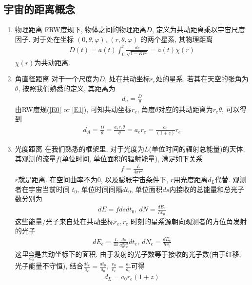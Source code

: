 \subsection{宇宙的距离概念}
\begin{enumerate}
    \item 物理距离 
    \subitem FRW度规下, 物体之间的物理距离$D$, 定义为共动距离乘以宇宙尺度因子. 对于处在坐标 $(0, \theta, \varphi)$, $(r, \theta, \varphi)$ 的两个星系, 其物理距离
    \begin{align*}
        D(t)=a(t)\int_0^r \frac{dr}{\sqrt{1-K r^2}}=a(t)\chi(r)
    \end{align*}
    $\chi(r)$为共动距离. 
    \item 角直径距离 
    \subitem 对于一个尺度为$D$, 处在共动坐标$r_e$处的星系, 若其在天空的张角为$\theta$, 按照我们熟悉的定义, 其距离为
    \begin{align*}
        d_a=\frac{D}{\theta}
    \end{align*}
    由RW度规(\ref{E0} or \ref{E1}), 可知共动坐标$r_e$, 角度$\theta$对应的共动距离为$r_e \theta$, 可以得到
    \begin{align*}
        d_A=\frac{D}{\theta}=\frac{a_e r_e \theta}{\theta}=a_e r_e =\frac{a_0}{(1+z)}r_e
    \end{align*}
    \item 光度距离 
    \subitem 在我们熟悉的框架里, 对于光度为$L$(单位时间的辐射总能量)的天体, 其观测的流量$f$(单位时间, 单位面积的辐射能量), 满足如下关系
    \begin{align*}
        f=\frac{L}{4 \pi r^2}
    \end{align*}
    $r$就是距离. 
    \subitem 在空间曲率不为0, 以及膨胀宇宙条件下,  $r$用光度距离$d_L$代替. 观测者在宇宙当前时间 $t_0$, 单位时间间隔$dt_0$, 单位面积$ds$内接收的总能量和总光子数分别为
    \begin{align*}
        dE=fdsdt_0,\ dN=\frac{d E_e}{hv_0}
    \end{align*}
    这些能量/光子来自处在共动坐标$r_e, r_e$ 时刻的星系源朝向观测者的方位角发射的光子
    \begin{align*}
        dE_e=\frac{L}{4\pi}\frac{ds}{a_0^2 r_e^2 }dt_e,\ dN_e=\frac{dE_e}{hv_e}
    \end{align*}
    这里$\frac{ds}{a_0^2}$是共动坐标下的面积. 由于发射的光子数等于接收的光子数(由于红移, 光子能量不守恒), 结合$\frac{dt_e}{a_e}=\frac{dt_0}{a_0},\ \frac{v_0}{v_e}=\frac{a_e}{a_0}$可得
    \begin{align*}
        d_L=a_0r_e(1+z)
    \end{align*}
    \begin{figure}[!htb]
        \centering
    \end{figure}
    
\end{enumerate}

